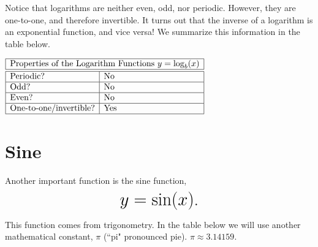 \documentclass[nooutcomes]{ximera}
\begin{document}
Notice that logarithms are neither even, odd, nor periodic. However, they are one-to-one, and therefore invertible. It turns out that the inverse of a logarithm is an exponential function, and vice versa! We summarize this information in the table below.

\begin{center}
$
\begin{array}{|l|l|}
 \hline
 \multicolumn{2}{|c|}{\text{\normalfont Properties of the Logarithm Functions } y=\log_b(x)} \\
\hline
 \hline
\text{Periodic?} & \text{No} \\ \hline
\text{Odd?} & \text{No} \\ \hline
\text{Even?} & \text{No} \\ \hline
\text{One-to-one/invertible?} & \text{Yes} \\ \hline
\end{array}
$
\end{center}

\newpage


\section{Sine}
Another important function is the sine function, $$ \mbox{\huge $y=\sin(x)$.}$$ 


This function comes from trigonometry. In the table below we will use another mathematical constant, $\pi$ (``pi" pronounced pie). $\pi \approx 3.14159$.

\begin{image}
\end{image}
\end{document}
